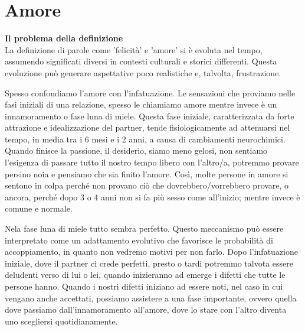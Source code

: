 \documentclass[12pt]{book} %
\begin{document}
\clearpage\section{Amore}
\noindent \textbf{\large Il problema della definizione} \\
La definizione di parole come 'felicità' e 'amore' si è evoluta nel tempo, assumendo significati diversi in contesti culturali e storici differenti. Questa evoluzione può generare aspettative poco realistiche e, talvolta, frustrazione.

Spesso confondiamo l'amore con l'infatuazione. Le sensazioni che proviamo nelle fasi iniziali di una relazione, spesso le chiamiamo amore mentre invece è un innamoramento o fase luna di miele. Questa fase iniziale, caratterizzata da forte attrazione e idealizzazione del partner, tende fisiologicamente ad attenuarsi nel tempo, in media tra i 6 mesi e i 2 anni, a causa di cambiamenti neurochimici. Quando finisce la passione, il desiderio, siamo meno gelosi, non sentiamo
l'esigenza di passare tutto il nostro tempo libero con l'altro/a, potremmo provare persino
noia e pensiamo che sia finito l'amore. Così, molte persone in amore si sentono
in colpa perché non provano ciò che dovrebbero/vorrebbero provare, o ancora, perché dopo 3 o 4 anni non si fa più sesso come all'inizio; mentre invece è comune e normale.

Nela fase luna di miele tutto sembra perfetto. Questo meccanismo può essere interpretato come un adattamento evolutivo che favorisce le probabilità di accoppiamento, in quanto non vedremo motivi per non farlo. Dopo l'infatuazione iniziale, dove il partner ci crede perfetti, presto o tardi potremmo talvota essere deludenti verso di lui o lei, quando inizieranno ad emerge i difetti che tutte le persone hanno. Quando
i nostri difetti iniziano ad essere noti, nel caso in cui vengano anche accettati, possiamo assistere a una fase
importante, ovvero quella dove passiamo dall'innamoramento all'amore, dove lo
stare con l'altro diventa uno scegliersi quotidianamente. 
\end{document}
